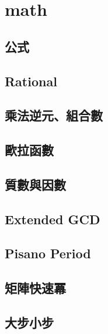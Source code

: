 \section{math}
    \subsection{公式}
        
    \subsection{Rational}
        
    \subsection{乘法逆元、組合數}
        
    \subsection{歐拉函數}
         \columnbreak
    \subsection{質數與因數}
        
    \subsection{Extended GCD}
        
    \subsection{Pisano Period}
        
    \subsection{矩陣快速冪}
        
    \subsection{大步小步}
         \columnbreak

